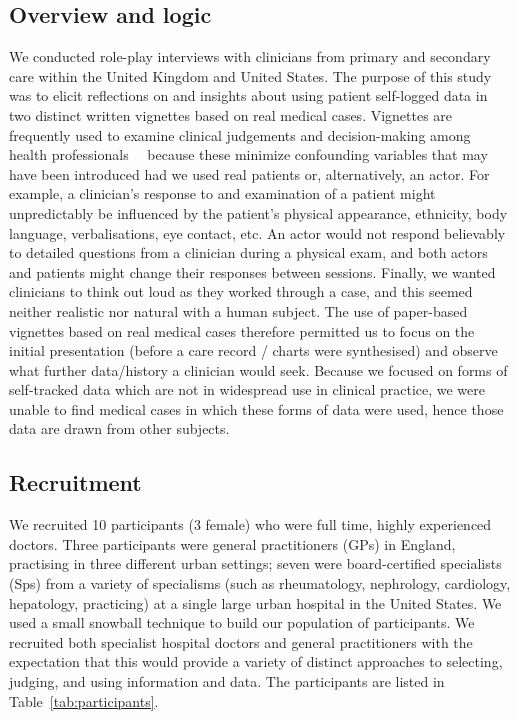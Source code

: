 \documentclass{sigchi}
\begin{document}
\subsection{Overview and logic}
We conducted role-play interviews with clinicians from primary and secondary care within the United Kingdom and United States. The purpose of this study was to elicit reflections on and insights about using patient self-logged data in two distinct written vignettes based on real medical cases.  Vignettes are frequently used to examine clinical judgements and decision-making among health professionals~\cite{evans2015vignette}~\cite{redelmeier1995probability} because these minimize confounding variables that may have been introduced had we used real patients or, alternatively, an actor. For example, a clinician’s response to and examination of a patient might unpredictably be influenced by the patient’s physical appearance, ethnicity, body language, verbalisations, eye contact, etc. An actor would not respond believably to detailed questions from a clinician during a physical exam, and both actors and patients might change their responses between sessions. Finally, we wanted clinicians to think out loud as they worked through a case, and this seemed neither realistic nor natural with a human subject.  The use of paper-based vignettes based on real medical cases therefore permitted us to focus on the initial presentation (before a care record / charts were synthesised) and observe what further data/history a clinician would seek. Because we focused on forms of self-tracked data which are not in widespread use in clinical practice, we were unable to find medical cases in which these forms of data were used, hence those data are drawn from other subjects. 


\subsection{Recruitment}
We recruited 10 participants (3 female) who were full time, highly experienced doctors.  Three participants were general practitioners (GPs) in England, practising in three different urban settings; seven were board-certified specialists (Sps) from a variety of specialisms (such as rheumatology, nephrology, cardiology, hepatology, practicing) at a single large urban hospital in the United States.  We used a small snowball technique to build our population of participants.   We recruited both specialist hospital doctors and general practitioners with the expectation that this would provide a variety of distinct approaches to selecting, judging, and using information and data.  The participants are listed in Table~\ref{tab:participants}.
\end{document}
